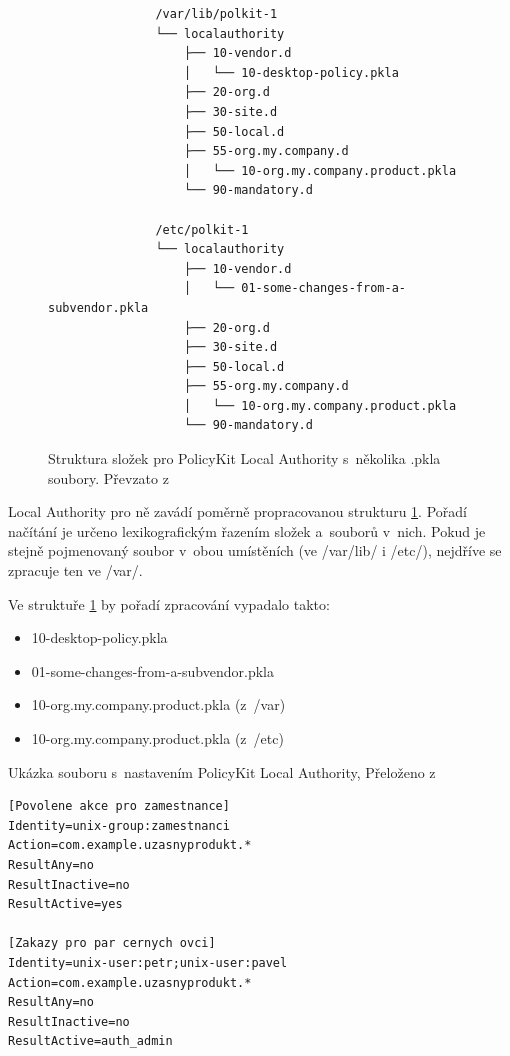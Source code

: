 \begin{figure}[h]
    \centering
    \begin{verbatim}
               /var/lib/polkit-1
               └── localauthority
                   ├── 10-vendor.d
                   │   └── 10-desktop-policy.pkla
                   ├── 20-org.d
                   ├── 30-site.d
                   ├── 50-local.d
                   ├── 55-org.my.company.d
                   │   └── 10-org.my.company.product.pkla
                   └── 90-mandatory.d

               /etc/polkit-1
               └── localauthority
                   ├── 10-vendor.d
                   │   └── 01-some-changes-from-a-subvendor.pkla
                   ├── 20-org.d
                   ├── 30-site.d
                   ├── 50-local.d
                   ├── 55-org.my.company.d
                   │   └── 10-org.my.company.product.pkla
                   └── 90-mandatory.d\end{verbatim}
\label{fig:pkit_strukture}
\caption{Struktura složek pro PolicyKit Local Authority s~několika .pkla soubory. Převzato z \cite{manpklocalauth}}
\end{figure}

Local Authority pro ně zavádí poměrně propracovanou strukturu \ref{fig:pkit_strukture}. Pořadí načítání je určeno lexikografickým řazením složek a~souborů v~nich. Pokud je stejně pojmenovaný soubor v~obou umístěních (ve /var/lib/ i /etc/), nejdříve se zpracuje ten ve /var/.

Ve struktuře \ref{fig:pkit_strukture} by pořadí zpracování vypadalo takto:
\begin{itemize}
\item 10-desktop-policy.pkla
\item 01-some-changes-from-a-subvendor.pkla
\item 10-org.my.company.product.pkla (z~/var)
\item 10-org.my.company.product.pkla (z~/etc)
\end{itemize}

\begin{mylisting}
\caption{Ukázka souboru s~nastavením PolicyKit Local Authority, Přeloženo z \cite{manpklocalauth}}
\label{fig:pkit_pkla}
\begin{lstlisting}
[Povolene akce pro zamestnance]
Identity=unix-group:zamestnanci
Action=com.example.uzasnyprodukt.*
ResultAny=no
ResultInactive=no
ResultActive=yes

[Zakazy pro par cernych ovci]
Identity=unix-user:petr;unix-user:pavel
Action=com.example.uzasnyprodukt.*
ResultAny=no
ResultInactive=no
ResultActive=auth_admin
\end{lstlisting}
\end{mylisting}

